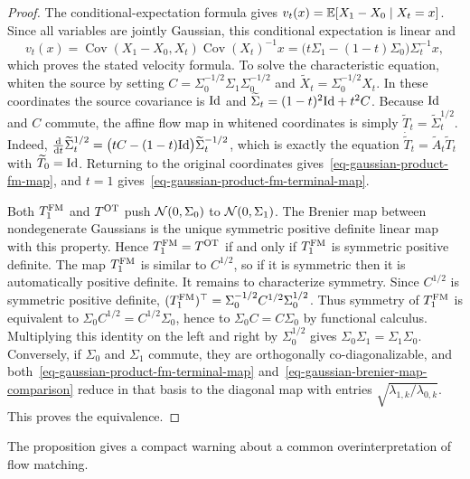 \begin{proof}
	The conditional-expectation formula gives
	\(v_t(x)=\mathbb{E}[X_1-X_0\mid X_t=x]\).
	Since all variables are jointly Gaussian, this conditional expectation is linear and
	\[
		v_t(x)
		=
		\operatorname{Cov}(X_1-X_0,X_t)\operatorname{Cov}(X_t)^{-1}x
		=
		\bigl(t\Sigma_1-(1-t)\Sigma_0\bigr)\Sigma_t^{-1}x,
	\]
		which proves the stated velocity formula. To solve the characteristic equation, whiten the source by setting \(C=\Sigma_0^{-1/2}\Sigma_1\Sigma_0^{-1/2}\) and \(\widetilde X_t=\Sigma_0^{-1/2}X_t\).
	In these coordinates the source covariance is $\mathrm{Id}$ and
	\(\widetilde\Sigma_t=(1-t)^2\mathrm{Id}+t^2C\).
	Because $\mathrm{Id}$ and $C$ commute, the affine flow map in whitened coordinates is simply $\widetilde T_t=\widetilde\Sigma_t^{1/2}$. Indeed,
	$\frac{\mathrm{d}}{\mathrm{d} t}\widetilde\Sigma_t^{1/2}=\bigl(tC-(1-t)\mathrm{Id}\bigr)\widetilde\Sigma_t^{-1/2}$, which is exactly the equation $\dot{\widetilde T}_t=\widetilde A_t\widetilde T_t$ with $\widetilde T_0=\mathrm{Id}$. Returning to the original coordinates gives~\eqref{eq-gaussian-product-fm-map}, and $t=1$ gives~\eqref{eq-gaussian-product-fm-terminal-map}.

		Both $T_1^{\rm FM}$ and $T^{\rm OT}$ push $\mathcal{N}(0,\Sigma_0)$ to $\mathcal{N}(0,\Sigma_1)$. The Brenier map between nondegenerate Gaussians is the unique symmetric positive definite linear map with this property. Hence $T_1^{\rm FM}=T^{\rm OT}$ if and only if $T_1^{\rm FM}$ is symmetric positive definite. The map $T_1^{\rm FM}$ is similar to $C^{1/2}$, so if it is symmetric then it is automatically positive definite. It remains to characterize symmetry. Since $C^{1/2}$ is symmetric positive definite, \((T_1^{\rm FM})^\top=\Sigma_0^{-1/2}C^{1/2}\Sigma_0^{1/2}\).
	Thus symmetry of $T_1^{\rm FM}$ is equivalent to
	$\Sigma_0 C^{1/2}=C^{1/2}\Sigma_0$, hence to $\Sigma_0 C=C\Sigma_0$ by functional calculus. Multiplying this identity on the left and right by $\Sigma_0^{1/2}$ gives $\Sigma_0\Sigma_1=\Sigma_1\Sigma_0$. Conversely, if $\Sigma_0$ and $\Sigma_1$ commute, they are orthogonally co-diagonalizable, and both~\eqref{eq-gaussian-product-fm-terminal-map} and~\eqref{eq-gaussian-brenier-map-comparison} reduce in that basis to the diagonal map with entries $\sqrt{\lambda_{1,k}/\lambda_{0,k}}$. This proves the equivalence.
\end{proof}

The proposition gives a compact warning about a common overinterpretation of flow matching.


